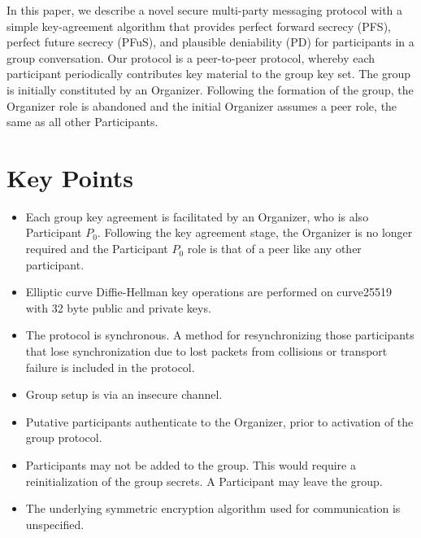 \documentclass[%
preprint,
amsmath,amssymb,
aps,
prb,
floatfix,
]{revtex4-1}
\begin{document}
In this paper, we describe a novel secure multi-party messaging protocol with a
simple key-agreement algorithm that provides perfect forward secrecy (PFS),
perfect future secrecy (PFuS),
and plausible deniability (PD) for participants in a group conversation. Our protocol
is a peer-to-peer protocol, whereby each
participant periodically contributes
key material to the group key set. The group is
initially constituted by an Organizer. Following the formation of the group, the
Organizer role is abandoned and the initial Organizer assumes a peer role, the
same as all other Participants.

\section{\label{sec:keypoints}Key Points}
\begin{itemize}
\item Each group key agreement is facilitated by an Organizer, who is also
Participant $P_0$. Following the key agreement stage, the Organizer is no longer
required and the Participant $P_0$ role is that of a peer like any other
participant.
\item Elliptic curve Diffie-Hellman key operations are performed on curve25519
with 32 byte
public and private keys.
\item The protocol is synchronous. A method for resynchronizing those
participants that lose synchronization due to lost packets from collisions or
transport failure is included in the protocol.
\item Group setup is via an insecure channel.
\item Putative participants authenticate to the Organizer, prior to
activation of the group protocol.
\item Participants may not be added to the group. This would
require a reinitialization of the group secrets. A Participant may leave the
group.
\item The underlying symmetric encryption algorithm used for communication is
unspecified.
\end{itemize}
\end{document}
